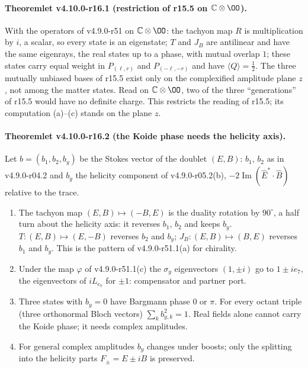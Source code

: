 \paragraph{Theoremlet v4.10.0-r16.1 (restriction of r15.5 on \(\mathbb C\otimes\OO\)).}
With the operators of v4.9.0-r51 on \(\mathbb C\otimes\OO\): the tachyon map \(R\) is multiplication by \(i\), a scalar, so every
state is an eigenstate; \(T\) and \(J_B\) are antilinear and have the same eigenrays, the real states up to a phase, with mutual
overlap \(1\); these states carry equal weight in \(P_{(\ell,r)}\) and \(P_{(-\ell,-r)}\) and have \(\langle Q\rangle=\tfrac12\).  The three
mutually unbiased bases of r15.5 exist only on the complexified amplitude plane \(z\), not among the matter states.  Read on
\(\mathbb C\otimes\OO\), two of the three ``generations'' of r15.5 would have no definite charge.  This restricts the reading of
r15.5; its computation (a)--(c) stands on the plane \(z\).

\paragraph{Theoremlet v4.10.0-r16.2 (the Koide phase needs the helicity axis).}
Let \(b=(b_1,b_2,b_y)\) be the Stokes vector of the doublet \((E,B)\): \(b_1\), \(b_2\) as in v4.9.0-r04.2 and \(b_y\) the helicity
component of v4.9.0-r05.2(b), \(-2\operatorname{Im}(\hat E^*\cdot\hat B)\) relative to the trace.
\begin{enumerate}[leftmargin=2em]
\item[(a)] The tachyon map \((E,B)\mapsto(-B,E)\) is the duality rotation by \(90^\circ\), a half turn about the helicity axis: it
reverses \(b_1\), \(b_2\) and keeps \(b_y\).  \(T\colon(E,B)\mapsto(E,-B)\) reverses \(b_2\) and \(b_y\); \(J_B\colon(E,B)\mapsto(B,E)\)
reverses \(b_1\) and \(b_y\).  This is the pattern of v4.9.0-r51.1(a) for chirality.
\item[(b)] Under the map \(\varphi\) of v4.9.0-r51.1(c) the \(\sigma_y\) eigenvectors \((1,\pm i)\) go to \(1\pm ie_7\), the
eigenvectors of \(iL_{e_7}\) for \(\pm1\): compensator and partner port.
\item[(c)] Three states with \(b_y=0\) have Bargmann phase \(0\) or \(\pi\).  For every octant triple (three orthonormal Bloch
vectors) \(\sum_k b_{y,k}^2=1\).  Real fields alone cannot carry the Koide phase; it needs complex amplitudes.
\item[(d)] For general complex amplitudes \(b_y\) changes under boosts; only the splitting into the helicity parts
\(F_\pm=E\pm iB\) is preserved.
\end{enumerate}


